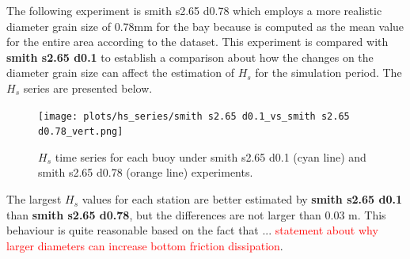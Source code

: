 \documentclass[12pt]{article}
\begin{document}
The following experiment is smith s2.65 d0.78 which employs a more realistic diameter grain size of 0.78mm for the bay because is computed as the mean value for the entire area according to the dataset. This experiment is compared with \textbf{smith s2.65 d0.1} to establish a comparison about how the changes on the diameter grain size can affect the estimation of $H_s$ for the simulation period. The $H_s$ series are presented below.

\begin{figure}[H]
    \centering
    \texttt{[image: plots/hs\_series/smith s2.65 d0.1\_vs\_smith s2.65 d0.78\_vert.png]}
    \caption{$H_{s}$ time series for each buoy under smith s2.65 d0.1 (cyan line) and smith s2.65 d0.78 (orange line) experiments.}
    \label{fig:hs_smith_def_vs_smith_0.78}
\end{figure}

The largest $H_s$ values for each station are better estimated by \textbf{smith s2.65 d0.1} than \textbf{smith s2.65 d0.78}, but the differences are not larger than 0.03 m. This behaviour is quite reasonable based on the fact that ... \textcolor{red}{statement about why larger diameters can increase bottom friction dissipation}.
\end{document}
